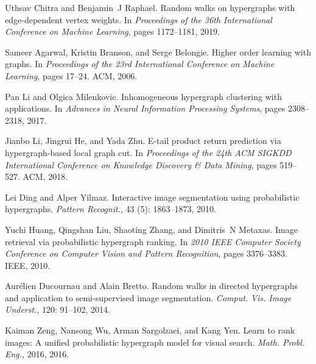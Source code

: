 Uthsav Chitra and Benjamin~J Raphael.
\newblock Random walks on hypergraphs with edge-dependent vertex weights.
\newblock In \emph{Proceedings of the 36th International Conference on Machine
    Learning}, pages 1172--1181, 2019.

Sameer Agarwal, Kristin Branson, and Serge Belongie.
\newblock Higher order learning with graphs.
\newblock In \emph{Proceedings of the 23rd International Conference on
    {{Machine}} Learning}, pages 17--24. {ACM}, 2006.

Pan Li and Olgica Milenkovic.
\newblock Inhomogeneous hypergraph clustering with applications.
\newblock In \emph{Advances in Neural Information Processing Systems}, pages
2308--2318, 2017.

Jianbo Li, Jingrui He, and Yada Zhu.
\newblock E-tail product return prediction via hypergraph-based local graph
cut.
\newblock In \emph{Proceedings of the 24th {{ACM SIGKDD}} International
    Conference on Knowledge Discovery \& Data Mining}, pages 519--527. {ACM},
2018.

Lei Ding and Alper Yilmaz.
\newblock Interactive image segmentation using probabilistic hypergraphs.
\newblock \emph{Pattern Recognit.}, 43 (5): 1863--1873, 2010.

Yuchi Huang, Qingshan Liu, Shaoting Zhang, and Dimitris~N Metaxas.
\newblock Image retrieval via probabilistic hypergraph ranking.
\newblock In \emph{2010 {{IEEE}} Computer Society Conference on Computer Vision
    and Pattern Recognition}, pages 3376--3383. {IEEE}, 2010.

Aur{\'e}lien Ducournau and Alain Bretto.
\newblock Random walks in directed hypergraphs and application to
semi-supervised image segmentation.
\newblock \emph{Comput. Vis. Image Underst.}, 120: 91--102, 2014.

Kaiman Zeng, Nansong Wu, Arman Sargolzaei, and Kang Yen.
\newblock Learn to rank images: {{A}} unified probabilistic hypergraph model
for visual search.
\newblock \emph{Math. Probl. Eng.}, 2016, 2016.


